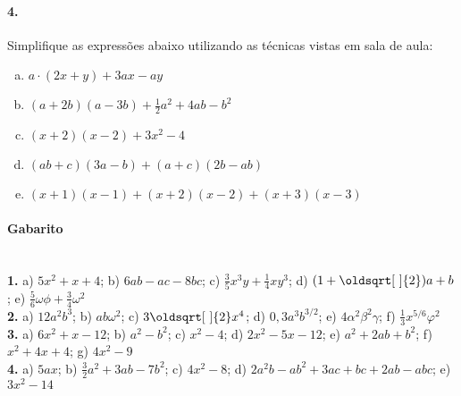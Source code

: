 \documentclass[a4paper,twocolumn,12pt]{article}
\renewcommand*{\sqrt}[2][\ ]{\oldsqrt[#1]{#2}}
\begin{document}
\paragraph*{4.} Simplifique as expressões abaixo utilizando as técnicas vistas em sala de aula:
\begin{enumerate}[a)]
\item $a\cdot(2x + y) + 3ax - ay$
\item $(a+2b)(a-3b) + \frac{1}{2}a^2 +4ab -b^2$
\item $(x+2)(x-2) + 3x^2 - 4$
\item $(ab +c)(3a - b) + (a + c)(2b - ab)$
\item $(x+1)(x-1) + (x+2)(x-2) + (x+3)(x-3)$
\end{enumerate}

\vspace*{\fill}

{\footnotesize \color{darkgray}
\paragraph*{Gabarito} \hspace*{\fill}\\
\textbf{1.} a) $5x^2 + x + 4$; b) $6ab - ac - 8bc$; c) $\frac{3}{5}x^3y + \frac{1}{4}xy^3$; d) $(1 + \sqrt{2})a + b$; e) $\frac{5}{6}\omega\phi +\frac{3}{4}\omega^2 $\\
\textbf{2.} a) $12a^2b^3$; b) $ab\omega^2$; c) $3\sqrt{2}x^4$; d) $0,\!3a^3b^{3/2}$; e) $4\alpha^2\beta^2\gamma$; f) $\frac{1}{3}x^{5/6}\varphi^2$\\
\textbf{3.} a) $6x^2 + x - 12$; b) $a^2 - b^2$; c) $x^2 - 4$; d) $2x^2 - 5x - 12$; e) $a^2 + 2ab + b^2$; f) $x^2 + 4x + 4$; g) $4x^2 - 9$\\
\textbf{4.} a) $5ax $; b) $\frac{3}{2}a^2 +3ab - 7b^2$; c) $4x^2 - 8$; d) $2a^2b - ab^2 + 3ac + bc + 2ab - abc$; e) $3x^2 - 14$
}
\end{document}
